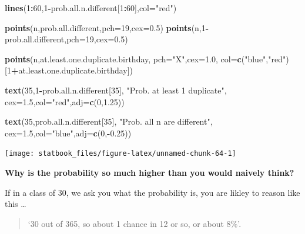 \documentclass[]{book}
\newenvironment{Shaded}{\begin{snugshade}}{\end{snugshade}}
\newcommand{\DataTypeTok}[1]{\textcolor[rgb]{0.13,0.29,0.53}{#1}}
\newcommand{\DecValTok}[1]{\textcolor[rgb]{0.00,0.00,0.81}{#1}}
\newcommand{\FloatTok}[1]{\textcolor[rgb]{0.00,0.00,0.81}{#1}}
\newcommand{\KeywordTok}[1]{\textcolor[rgb]{0.13,0.29,0.53}{\textbf{#1}}}
\newcommand{\NormalTok}[1]{#1}
\newcommand{\OperatorTok}[1]{\textcolor[rgb]{0.81,0.36,0.00}{\textbf{#1}}}
\newcommand{\StringTok}[1]{\textcolor[rgb]{0.31,0.60,0.02}{#1}}
\begin{document}
\begin{Shaded}
\begin{Highlighting}[]
\KeywordTok{lines}\NormalTok{(}\DecValTok{1}\OperatorTok{:}\DecValTok{60}\NormalTok{,}\DecValTok{1}\OperatorTok{-}\NormalTok{prob.all.n.different[}\DecValTok{1}\OperatorTok{:}\DecValTok{60}\NormalTok{],}\DataTypeTok{col=}\StringTok{"red"}\NormalTok{)}

\KeywordTok{points}\NormalTok{(n,prob.all.different,}\DataTypeTok{pch=}\DecValTok{19}\NormalTok{,}\DataTypeTok{cex=}\FloatTok{0.5}\NormalTok{)}
\KeywordTok{points}\NormalTok{(n,}\DecValTok{1}\OperatorTok{-}\NormalTok{prob.all.different,}\DataTypeTok{pch=}\DecValTok{19}\NormalTok{,}\DataTypeTok{cex=}\FloatTok{0.5}\NormalTok{)}

\KeywordTok{points}\NormalTok{(n,at.least.one.duplicate.birthday,}
       \DataTypeTok{pch=}\StringTok{"X"}\NormalTok{,}\DataTypeTok{cex=}\FloatTok{1.0}\NormalTok{,}
       \DataTypeTok{col=}\KeywordTok{c}\NormalTok{(}\StringTok{"blue"}\NormalTok{,}\StringTok{"red"}\NormalTok{)[}\DecValTok{1}\OperatorTok{+}\NormalTok{at.least.one.duplicate.birthday])}

\KeywordTok{text}\NormalTok{(}\DecValTok{35}\NormalTok{,}\DecValTok{1}\OperatorTok{-}\NormalTok{prob.all.n.different[}\DecValTok{35}\NormalTok{],}
     \StringTok{"Prob. at least 1 duplicate"}\NormalTok{,}
     \DataTypeTok{cex=}\FloatTok{1.5}\NormalTok{,}\DataTypeTok{col=}\StringTok{"red"}\NormalTok{,}\DataTypeTok{adj=}\KeywordTok{c}\NormalTok{(}\DecValTok{0}\NormalTok{,}\FloatTok{1.25}\NormalTok{))}

\KeywordTok{text}\NormalTok{(}\DecValTok{35}\NormalTok{,prob.all.n.different[}\DecValTok{35}\NormalTok{],}
     \StringTok{"Prob. all n are different"}\NormalTok{,}
     \DataTypeTok{cex=}\FloatTok{1.5}\NormalTok{,}\DataTypeTok{col=}\StringTok{"blue"}\NormalTok{,}\DataTypeTok{adj=}\KeywordTok{c}\NormalTok{(}\DecValTok{0}\NormalTok{,}\OperatorTok{-}\FloatTok{0.25}\NormalTok{))}
\end{Highlighting}
\end{Shaded}

\begin{center}\texttt{[image: statbook\_files/figure-latex/unnamed-chunk-64-1]} \end{center}

\textbf{Why is the probability so much higher than you would naively think?}

If in a class of 30, we ask you what the probability is, you are likley to reason like this \ldots{}

\begin{quote}
`30 out of 365, so about 1 chance in 12 or so, or about 8\%'.
\end{quote}
\end{document}
